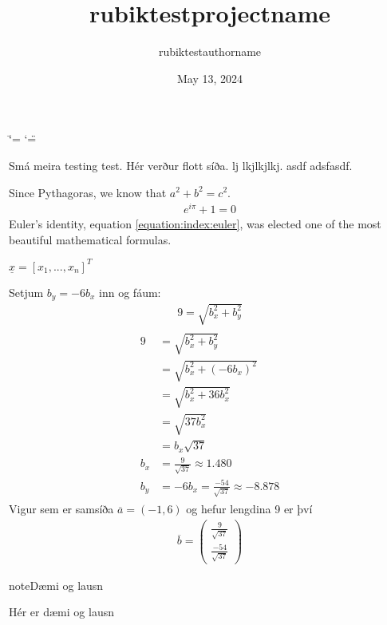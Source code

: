 \documentclass[letterpaper,10pt,english]{sphinxmanual}
\title{rubiktest\sphinxhyphen{}projectname}
\date{May 13, 2024}
\author{rubiktest\sphinxhyphen{}authorname}
\begin{document}
\ifdefined\shorthandoff
  \ifnum\catcode`\=\string=\active\shorthandoff{=}\fi
  \ifnum\catcode`\"=\active{}\fi
\fi

\pagestyle{empty}
\sphinxmaketitle
\pagestyle{plain}
\sphinxtableofcontents
\pagestyle{normal}
\label{\detokenize{index::doc}}


\sphinxAtStartPar
Smá meira testing test. Hér verður flott síða. lj lkjlkjlkj. asdf adsfasdf.

\sphinxAtStartPar
Since Pythagoras, we know that \(a^2 + b^2 = c^2\).
\begin{equation}\label{equation:index:euler}
\begin{split}e^{i\pi} + 1 = 0\end{split}
\end{equation}
\sphinxAtStartPar
Euler’s identity, equation \eqref{equation:index:euler}, was elected one of the most
beautiful mathematical formulas.

\sphinxAtStartPar
\(\underline{x}=[  x_{1}, ...,  x_{n}]^{T}\)

\sphinxAtStartPar
Setjum \(b_y=-6b_x\) inn og fáum:
\begin{equation*}
\begin{split}9 = \sqrt{b_x^2+b_y^2}\end{split}
\end{equation*}\begin{equation*}
\begin{split}\begin{aligned}
9 &= \sqrt{b_x^2+b_y^2}\\
&=\sqrt{b_x^2+(-6b_x)^2} \\
&= \sqrt{b_x^2+36b_x^2} \\
&=\sqrt{37b_x^2} \\
&=b_x\sqrt{37} \\
b_x&=\frac{9}{\sqrt{37}} \approx 1.480\\
b_y&= -6b_x = \frac{-54}{\sqrt{37}} \approx -8.878
\end{aligned}\end{split}
\end{equation*}
\sphinxAtStartPar
Vigur sem er samsíða \(\overline{a}=(-1,6)\) og hefur lengdina 9 er því
\begin{equation*}
\begin{split}\overline{b}= \begin{pmatrix} \frac{9}{\sqrt{37}} \\  \frac{-54}{\sqrt{37}} \end{pmatrix}\end{split}
\end{equation*}
\begin{sphinxadmonition}{note}{Dæmi og lausn}

\sphinxAtStartPar
Hér er dæmi og lausn
\end{sphinxadmonition}
\end{document}
